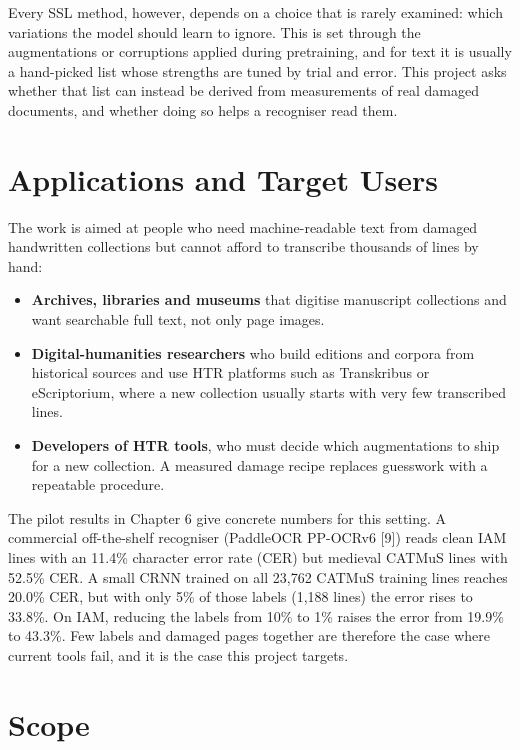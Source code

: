 \documentclass[
  12pt,
  a4paper,
]{report}
\providecommand{\tightlist}{%
  \setlength{\itemsep}{0pt}\setlength{\parskip}{0pt}}
\begin{document}
Every SSL method, however, depends on a choice that is rarely examined:
which variations the model should learn to ignore. This is set through
the augmentations or corruptions applied during pretraining, and for
text it is usually a hand-picked list whose strengths are tuned by trial
and error. This project asks whether that list can instead be derived
from measurements of real damaged documents, and whether doing so helps
a recogniser read them.

\section{Applications and Target
Users}\label{applications-and-target-users}

The work is aimed at people who need machine-readable text from damaged
handwritten collections but cannot afford to transcribe thousands of
lines by hand:

\begin{itemize}
\tightlist
\item
  \textbf{Archives, libraries and museums} that digitise manuscript
  collections and want searchable full text, not only page images.
\item
  \textbf{Digital-humanities researchers} who build editions and corpora
  from historical sources and use HTR platforms such as Transkribus or
  eScriptorium, where a new collection usually starts with very few
  transcribed lines.
\item
  \textbf{Developers of HTR tools}, who must decide which augmentations
  to ship for a new collection. A measured damage recipe replaces
  guesswork with a repeatable procedure.
\end{itemize}

The pilot results in Chapter 6 give concrete numbers for this setting. A
commercial off-the-shelf recogniser (PaddleOCR PP-OCRv6 {[}9{]}) reads
clean IAM lines with an 11.4\% character error rate (CER) but medieval
CATMuS lines with 52.5\% CER. A small CRNN trained on all 23,762 CATMuS
training lines reaches 20.0\% CER, but with only 5\% of those labels
(1,188 lines) the error rises to 33.8\%. On IAM, reducing the labels
from 10\% to 1\% raises the error from 19.9\% to 43.3\%. Few labels and
damaged pages together are therefore the case where current tools fail,
and it is the case this project targets.

\section{Scope}\label{scope}
\end{document}
